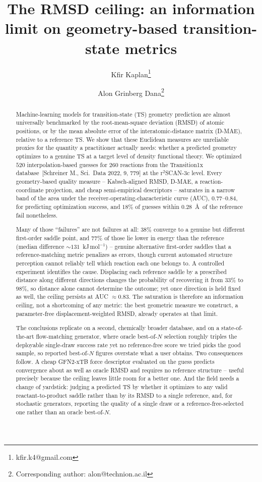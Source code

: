\documentclass[11pt]{article}
\title{\textbf{The RMSD ceiling: an information limit on geometry-based
transition-state metrics}}
\author[1,3]{Kfir Kaplan\thanks{kfir.k4@gmail.com}}
\author[1,2,3]{Alon Grinberg Dana\thanks{Corresponding author: alon@technion.ac.il}}
\affil[1]{Wolfson Department of Chemical Engineering, Technion -- Israel Institute of Technology, Haifa 3200003, Israel}
\affil[2]{Grand Technion Energy Program (GTEP), Technion -- Israel Institute of Technology, Haifa 3200003, Israel}
\affil[3]{Boeing-Technion SAF Innovation Center, Technion -- Israel Institute of Technology, Haifa 3200003, Israel}
\date{}
\begin{document}
\maketitle

\begin{abstract}
Machine-learning models for transition-state (TS) geometry prediction are almost
universally benchmarked by the root-mean-square deviation (RMSD) of atomic
positions, or by the mean absolute error of the interatomic-distance matrix
(D-MAE), relative to a reference TS. We show that these Euclidean measures are
unreliable proxies for the quantity a practitioner actually needs: whether a
predicted geometry optimizes to a genuine TS at a target level of density
functional theory. We optimized $520$ interpolation-based guesses for $260$ reactions from the
Transition1x database~[Schreiner M., Sci.\ Data 2022, 9, 779] at the r$^2$SCAN-3c
level. Every geometry-based quality measure -- Kabsch-aligned RMSD, D-MAE,
a reaction-coordinate projection, and cheap semi-empirical descriptors --
saturates in a narrow band of the area under the receiver-operating-characteristic
curve (AUC), $0.77$--$0.84$, for predicting optimization success, and $18\%$ of
guesses within $0.28$~\AA\ of the reference fail nonetheless.

Many of those ``failures'' are not failures at all: $38\%$ converge to a genuine
but different first-order saddle point, and $77\%$ of those lie lower in energy
than the reference (median difference $\sim 131$~kJ\,mol$^{-1}$) -- genuine
alternative first-order saddles that a reference-matching metric penalizes as
errors, though
current automated structure perception cannot reliably tell which reaction each
one belongs to. A controlled experiment identifies the cause. Displacing each
reference saddle by a prescribed distance along different directions changes the
probability of recovering it from $33\%$ to $98\%$, so distance alone cannot
determine the outcome; yet once direction is held fixed as well, the ceiling
persists at AUC $\approx 0.83$. The saturation is therefore an information
ceiling, not a shortcoming of any metric: the best geometric measure we construct,
a parameter-free displacement-weighted RMSD, already operates at that limit.

The conclusions replicate on a second, chemically broader database, and on a
state-of-the-art flow-matching generator, where oracle best-of-$N$ selection
roughly triples the deployable single-draw success rate yet no reference-free
score we tried picks the good sample, so reported best-of-$N$ figures overstate
what a user obtains. Two consequences follow. A cheap GFN2-xTB force descriptor evaluated on
the guess predicts convergence about as well as oracle RMSD and requires no
reference structure -- useful precisely because the ceiling leaves little room
for a better one. And the field needs a change of yardstick: judging a predicted TS by
whether it optimizes to any valid reactant-to-product saddle rather than by its
RMSD to a single reference, and, for stochastic generators, reporting the quality
of a single draw or a reference-free-selected one rather than an oracle
best-of-$N$.
\end{abstract}
\end{document}
